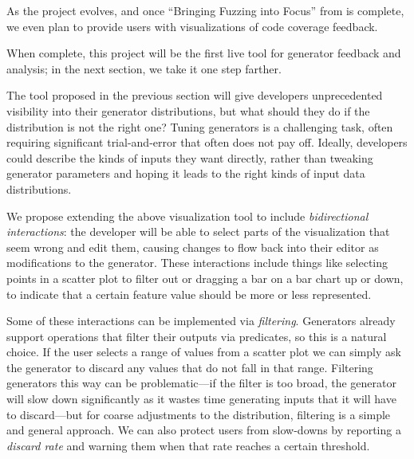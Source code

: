 \iflater
As the project evolves, and once ``Bringing Fuzzing into Focus'' from
 is complete, we even plan to provide users with
visualizations of code coverage feedback.
\fi

When complete, this project will be the first live tool for generator
feedback and analysis; in the next section, we take it one step farther.



The tool proposed in the previous section will give developers unprecedented
visibility into their generator distributions, but what should they do if the
distribution is not the right one? Tuning generators is a challenging task,
often requiring significant trial-and-error that often does not pay off.
Ideally, developers could describe the kinds of inputs they want directly,
rather than tweaking generator parameters and hoping it leads to the right kinds
of input data distributions.

We propose extending the above visualization tool to include {\em bidirectional
interactions}: the developer will be able to select parts of the visualization
that seem wrong and edit them, causing changes to flow back into their editor as
modifications to the generator. These interactions include things like
selecting points in a scatter plot to filter out or dragging a bar on a bar
chart up or down, to indicate that a certain feature value should be more or
less represented.

Some of these interactions can be implemented via {\em filtering}. Generators
already support operations that filter their outputs via predicates, so this is
a natural choice. If the user selects a range of values from a scatter plot we
can simply ask the generator to discard any values that do not fall in that
range.  Filtering generators this way can be problematic---if the filter is too
broad, the generator will slow down significantly as it wastes time generating
inputs that it will have to discard---but for coarse adjustments to the
distribution, filtering is a simple and general approach.  We can also protect
users from slow-downs by reporting a {\em discard rate} and warning them when
that rate reaches a certain threshold.

